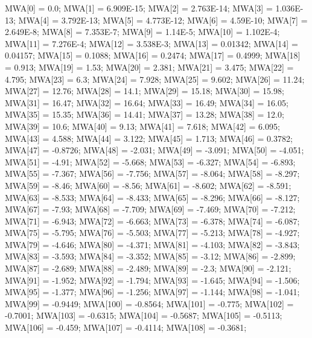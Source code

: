 \begin{code}
\begin{hide}
{      MWA[0] = 0.0;
      MWA[1] = 6.909E-15;
      MWA[2] = 2.763E-14;
      MWA[3] = 1.036E-13;
      MWA[4] = 3.792E-13;
      MWA[5] = 4.773E-12;
      MWA[6] = 4.59E-10;
      MWA[7] = 2.649E-8;
      MWA[8] = 7.353E-7;
      MWA[9] = 1.14E-5;
      MWA[10] = 1.102E-4;
      MWA[11] = 7.276E-4;
      MWA[12] = 3.538E-3;
      MWA[13] = 0.01342;
      MWA[14] = 0.04157;
      MWA[15] = 0.1088;
      MWA[16] = 0.2474;
      MWA[17] = 0.4999;
      MWA[18] = 0.913;
      MWA[19] = 1.53;
      MWA[20] = 2.381;
      MWA[21] = 3.475;
      MWA[22] = 4.795;
      MWA[23] = 6.3;
      MWA[24] = 7.928;
      MWA[25] = 9.602;
      MWA[26] = 11.24;
      MWA[27] = 12.76;
      MWA[28] = 14.1;
      MWA[29] = 15.18;
      MWA[30] = 15.98;
      MWA[31] = 16.47;
      MWA[32] = 16.64;
      MWA[33] = 16.49;
      MWA[34] = 16.05;
      MWA[35] = 15.35;
      MWA[36] = 14.41;
      MWA[37] = 13.28;
      MWA[38] = 12.0;
      MWA[39] = 10.6;
      MWA[40] = 9.13;
      MWA[41] = 7.618;
      MWA[42] = 6.095;
      MWA[43] = 4.588;
      MWA[44] = 3.122;
      MWA[45] = 1.713;
      MWA[46] = 0.3782;
      MWA[47] = -0.8726;
      MWA[48] = -2.031;
      MWA[49] = -3.091;
      MWA[50] = -4.051;
      MWA[51] = -4.91;
      MWA[52] = -5.668;
      MWA[53] = -6.327;
      MWA[54] = -6.893;
      MWA[55] = -7.367;
      MWA[56] = -7.756;
      MWA[57] = -8.064;
      MWA[58] = -8.297;
      MWA[59] = -8.46;
      MWA[60] = -8.56;
      MWA[61] = -8.602;
      MWA[62] = -8.591;
      MWA[63] = -8.533;
      MWA[64] = -8.433;
      MWA[65] = -8.296;
      MWA[66] = -8.127;
      MWA[67] = -7.93;
      MWA[68] = -7.709;
      MWA[69] = -7.469;
      MWA[70] = -7.212;
      MWA[71] = -6.943;
      MWA[72] = -6.663;
      MWA[73] = -6.378;
      MWA[74] = -6.087;
      MWA[75] = -5.795;
      MWA[76] = -5.503;
      MWA[77] = -5.213;
      MWA[78] = -4.927;
      MWA[79] = -4.646;
      MWA[80] = -4.371;
      MWA[81] = -4.103;
      MWA[82] = -3.843;
      MWA[83] = -3.593;
      MWA[84] = -3.352;
      MWA[85] = -3.12;
      MWA[86] = -2.899;
      MWA[87] = -2.689;
      MWA[88] = -2.489;
      MWA[89] = -2.3;
      MWA[90] = -2.121;
      MWA[91] = -1.952;
      MWA[92] = -1.794;
      MWA[93] = -1.645;
      MWA[94] = -1.506;
      MWA[95] = -1.377;
      MWA[96] = -1.256;
      MWA[97] = -1.144;
      MWA[98] = -1.041;
      MWA[99] = -0.9449;
      MWA[100] = -0.8564;
      MWA[101] = -0.775;
      MWA[102] = -0.7001;
      MWA[103] = -0.6315;
      MWA[104] = -0.5687;
      MWA[105] = -0.5113;
      MWA[106] = -0.459;
      MWA[107] = -0.4114;
      MWA[108] = -0.3681;
}
\end{hide}
\end{code}
